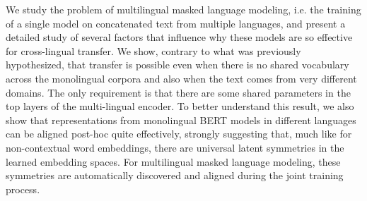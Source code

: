 We study the problem of multilingual masked language modeling, i.e. the training of a single model on concatenated text from multiple languages, and present a detailed study of several factors that influence why these models are so effective for cross-lingual transfer. We show, contrary to what was previously hypothesized, that transfer is possible even when there is no shared vocabulary across the monolingual corpora and also when the text comes from very different domains. The only requirement is that there are some shared parameters in the top layers of the multi-lingual encoder. To better understand this result, we also show that representations from monolingual BERT models in different languages can be aligned post-hoc quite effectively, strongly suggesting that, much like for non-contextual word embeddings, there are universal latent symmetries in the learned embedding spaces. For multilingual masked language modeling, these symmetries are automatically discovered and aligned during the joint training process.
